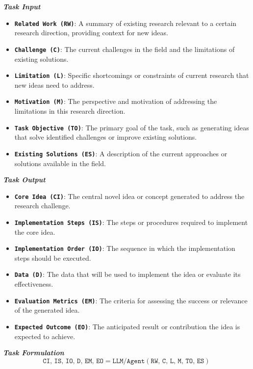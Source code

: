 \begin{tcolorbox}[
    breakable,
    title=Task Definition of Idea Generation,
    colback=LighterGray,
    colframe=DeepPurple,
    colbacktitle=DeepPurple,
    coltitle=White
]
\textbf{\emph{\textcolor{DeepPurple}{Task Input}}}
\begin{itemize}
    \item \texttt{\textbf{Related Work (RW)}}: A summary of existing research relevant to a certain research direction, providing context for new ideas.
    \item \texttt{\textbf{Challenge (C)}}: The current challenges in the field and the limitations of existing solutions.
    \item \texttt{\textbf{Limitation (L)}}: Specific shortcomings or constraints of current research that new ideas need to address.
    \item \texttt{\textbf{Motivation (M)}}: The perspective and motivation of addressing the limitations in this research direction.
    \item \texttt{\textbf{Task Objective (TO)}}: The primary goal of the task, such as generating ideas that solve identified challenges or improve existing solutions.
    \item \texttt{\textbf{Existing Solutions (ES)}}: A description of the current approaches or solutions available in the field.
\end{itemize}

\textbf{\emph{\textcolor{DeepPurple}{Task Output}}}
\begin{itemize}
    \item \texttt{\textbf{Core Idea (CI)}}: The central novel idea or concept generated to address the research challenge.
    \item \texttt{\textbf{Implementation Steps (IS)}}: The steps or procedures required to implement the core idea.
    \item \texttt{\textbf{Implementation Order (IO)}}: The sequence in which the implementation steps should be executed.
    \item \texttt{\textbf{Data (D)}}: The data that will be used to implement the idea or evaluate its effectiveness.
    \item \texttt{\textbf{Evaluation Metrics (EM)}}: The criteria for assessing the success or relevance of the generated idea.
    \item \texttt{\textbf{Expected Outcome (EO)}}: The anticipated result or contribution the idea is expected to achieve.
\end{itemize}

\textbf{\emph{\textcolor{DeepPurple}{Task Formulation}}}
\[
\texttt{CI, IS, IO, D, EM, EO} = \texttt{LLM/Agent}(\texttt{RW, C, L, M, TO, ES})
\]
\end{tcolorbox}

